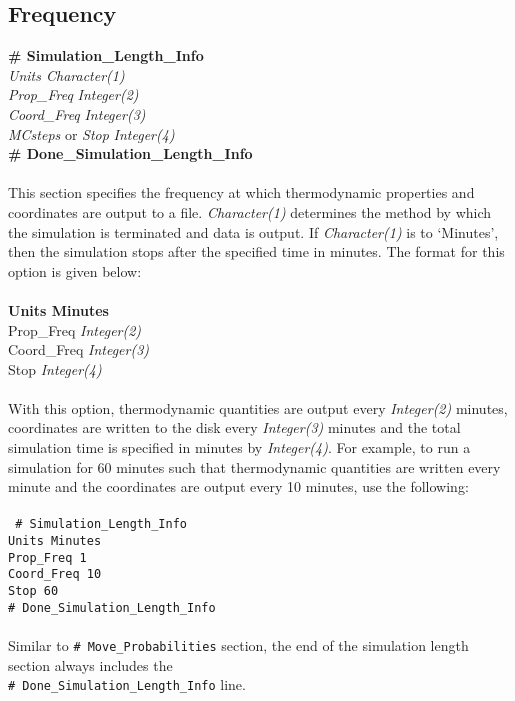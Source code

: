 \subsection{Frequency}\label{sec:Simulation_Length_Info}
{\bf \# Simulation\_Length\_Info} \\
{\it Units  Character(1)} \\
{\it Prop\_Freq} {\it Integer(2)} \\
{\it Coord\_Freq} {\it Integer(3)} \\
{\it MCsteps} or {\em Stop} {\it Integer(4)} \\ 
{\bf \# Done\_Simulation\_Length\_Info} \\ \\
%
This section specifies the frequency at which thermodynamic properties and coordinates are output
to a file. {\it Character(1)} determines the method by which the simulation is terminated and
data is output. If {\it Character(1)} is to `Minutes', then the simulation stops after the specified 
time in minutes. The format for this option is given below: \\ \\
%
{\bf Units    Minutes} \\
Prop\_Freq       {\it Integer(2) }\\
Coord\_Freq        {\it Integer(3)} \\
Stop                  {\it Integer(4)} \\ \\
%
With this option, thermodynamic quantities are output every {\it Integer(2)} minutes, 
coordinates are written to the disk every {\it Integer(3)} minutes and the total simulation
time is specified in minutes by {\it Integer(4)}. For example, to run a simulation for 60 minutes
such that thermodynamic quantities are written every minute and the coordinates are output
every 10 minutes, use the following: \\ \\
%
\texttt{
\# Simulation\_Length\_Info \\
Units    Minutes \\
Prop\_Freq    1 \\
Coord\_Freq       10 \\
Stop                 60 \\ 
\# Done\_Simulation\_Length\_Info \\ \\}
%
Similar to \texttt{\# Move\_Probabilities} section, the end of the simulation length section 
always includes the \\ \texttt{\#~Done\_Simulation\_Length\_Info} line. \\ \\
